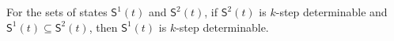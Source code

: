 \begin{lemma}
For the sets of states $\mathsf{S}^{1}(t)$ and $\mathsf{S}^{2}(t)$, if $\mathsf{S}^{2}(t)$ is $k$-step determinable and $\mathsf{S}^{1}(t)\subseteq \mathsf{S}^{2}(t)$, then $\mathsf{S}^{1}(t)$ is $k$-step determinable.
  \label{lemm:4}
\end{lemma}
